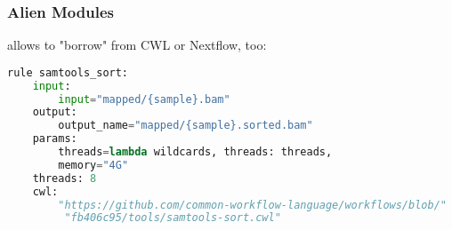 \begin{frame}[fragile]
	\frametitle{Alien Modules}
	\Snakemake allows to "borrow" from CWL or Nextflow, too:
	\begin{lstlisting}[language=Python,style=Python]
rule samtools_sort:
    input:
        input="mapped/{sample}.bam"
    output:
        output_name="mapped/{sample}.sorted.bam"
    params:
        threads=lambda wildcards, threads: threads,
        memory="4G"
    threads: 8
    cwl:
        "https://github.com/common-workflow-language/workflows/blob/"
         "fb406c95/tools/samtools-sort.cwl"
	\end{lstlisting}	
\end{frame}